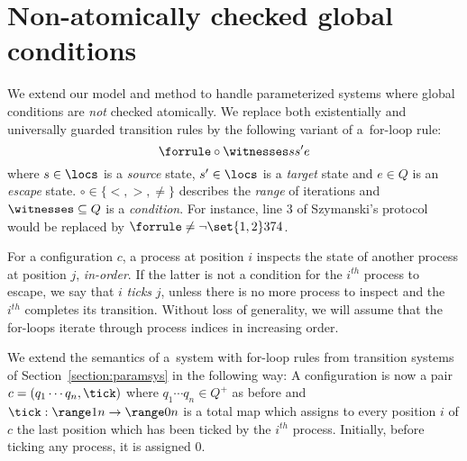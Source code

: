 
\section{Non-atomically checked global conditions}
\label{section:non-atomic}
We extend our model and method to handle parameterized systems where
global conditions are \emph{not} checked atomically.
%
We replace both existentially and universally guarded transition rules
by the following variant of a~for-loop rule:
$$%
\forrule \circ \witnesses s {s'} e%
$$
where $s\in\locs$ is a \emph{source} state, $s'\in\locs$ is a
\emph{target} state and $e\in Q$ is an \emph{escape}
state. $\circ\in\{<,>,\neq\}$ describes the \emph{range} of iterations
and $\witnesses\subseteq Q$ is a \emph{condition}.
%
For instance, line 3 of Szymanski's protocol would be replaced by
\mbox{$\forrule \neq {\neg\set{1,2}} 3 7 4$}. 

For a configuration $c$, a process at position $i$ inspects the state
of another process at position $j$, \emph{in-order}.
%
If the latter is not a condition for the $i^{th}$ process to escape,
we say that $i$ \emph{ticks} $j$, unless there is no more process to
inspect and the $i^{th}$ completes its transition.
%
Without loss of generality, we will assume that the for-loops iterate
through process indices in increasing order.

%
We extend the semantics of a~system with for-loop rules from
transition systems of Section~\ref{section:paramsys} in the following
way: %
A configuration is now a pair $c = (q_1\cdots q_n,\tick)$ where
$q_1\cdots q_n\in Q^+$ as before and $\tick:\range 1 n \rightarrow
\range 0 n$ is a total map which assigns to every position $i$ of $c$
the last position which has been ticked by the $i^{th}$ process. %
Initially, before ticking any process, it is assigned $0$.


